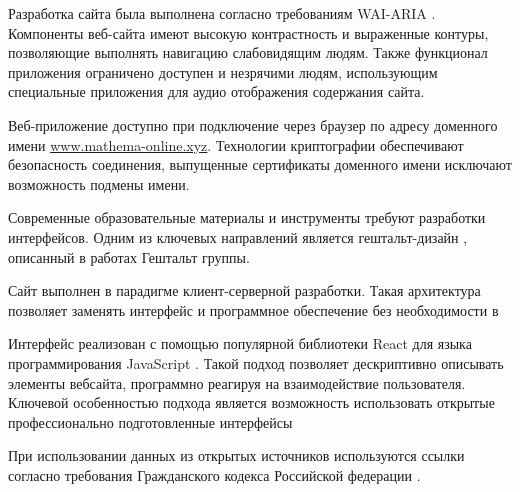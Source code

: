 Разработка сайта была выполнена согласно требованиям WAI-ARIA \cite{craig2009accessible}.
Компоненты веб-сайта имеют высокую контрастность и выраженные контуры, позволяющие выполнять навигацию слабовидящим людям. 
Также функционал приложения ограничено доступен и незрячими людям, использующим специальные приложения для аудио отображения
содержания сайта.

Веб-приложение доступно при подключение через браузер по адресу доменного имени \url{www.mathema-online.xyz}. 
Технологии криптографии обеспечивают безопасность соединения, выпущенные сертификаты доменного имени 
исключают возможность подмены имени.

Современные образовательные материалы и инструменты требуют разработки интерфейсов. 
Одним из ключевых направлений является гештальт-дизайн \cite{wertheimer1938laws}, описанный в работах Гештальт группы.

Сайт выполнен в парадигме клиент-серверной разработки. Такая архитектура
позволяет заменять интерфейс и программное обеспечение без необходимости в 

Интерфейс реализован с помощью популярной библиотеки React для языка программирования JavaScript \cite{ackenheimer2015introduction}.
Такой подход позволяет дескриптивно описывать элементы вебсайта, программно реагируя на взаимодействие пользователя. 
Ключевой особенностью подхода является возможность использовать открытые профессионально подготовленные интерфейсы 

При использовании данных из открытых источников используются ссылки согласно требования Гражданского кодекса
Российской федерации \cite{law1274} \cite{law1260}.
